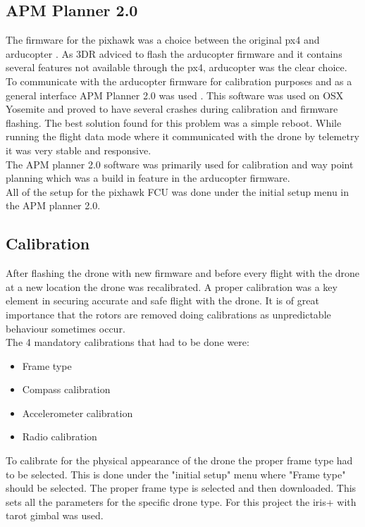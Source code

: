 \subsection*{APM Planner 2.0}
The firmware for the pixhawk was a choice between the original px4 and arducopter \cite{Ref:Arducopter}. As 3DR adviced to flash the arducopter firmware and it contains several features not available through the px4, arducopter was the clear choice.\\
To communicate with the arducopter firmware for calibration purposes and as a general interface APM Planner 2.0 was used \cite{Ref:APM2}. This software was used on OSX Yosemite and proved to have several crashes during calibration and firmware flashing. The best solution found for this problem was a simple reboot. While running the flight data mode where it communicated with the drone by telemetry it was very stable and responsive.\\
The APM planner 2.0 software was primarily used for calibration and way point planning which was a build in feature in the arducopter firmware.\\
All of the setup for the pixhawk FCU was done under the initial setup menu in the APM planner 2.0.

\subsection*{Calibration}

After flashing the drone with new firmware and before every flight with the drone at a new location the drone was recalibrated. A proper calibration was a key element in securing accurate and safe flight with the drone. It is of great importance that the rotors are removed doing calibrations as unpredictable behaviour sometimes occur.\\
The 4 mandatory calibrations that had to be done were:
\begin{itemize}
\item Frame type
\item Compass calibration
\item Accelerometer calibration
\item Radio calibration
\end{itemize}

To calibrate for the physical appearance of the drone the proper frame type had to be selected. This is done under the "initial setup" menu where "Frame type" should be selected. The proper frame type is selected and then downloaded. This sets all the parameters for the specific drone type. For this project the iris+ with tarot gimbal was used.\\


